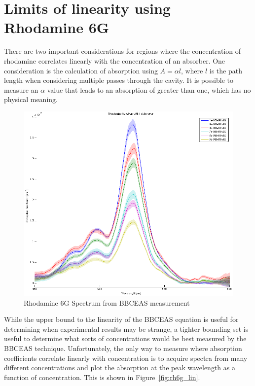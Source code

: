 \section{Limits of linearity using Rhodamine 6G}\label{sec:rhodamine}

There are two important considerations for regions where the concentration of
rhodamine correlates linearly with the concentration of an absorber. One
consideration is the calculation of absorption using $A = \alpha  l$, where $l$
is the path length when considering multiple passes through the cavity.  It is
possible to measure an $\alpha$ value that leads to an absorption of greater
than one, which has no physical meaning.

\begin{figure}
\begin{center}
\includegraphics[width=\textwidth]{figures/Rh6G_absorption_cross_section_with_error}
\end{center}
\caption{Rhodamine 6G Spectrum from \ac{BBCEAS} measurement}
\label{fig:rh6g}
\end{figure}


While the upper bound to the linearity of the \ac{BBCEAS} equation is useful
for determining when experimental results may be strange, a tighter bounding
set is useful to determine what sorts of concentrations would be best measured
by the \ac{BBCEAS} technique. Unfortunately, the only way to measure where
absorption coefficients correlate linearly with concentration is to acquire
spectra from many different concentrations and plot the absorption at the peak
wavelength as a function of concentration. This is shown in
Figure~\ref{fig:rh6g_lin}.

